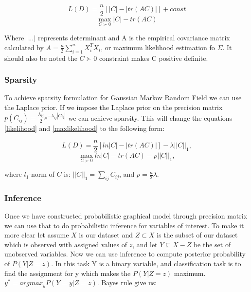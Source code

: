 \documentclass{article} %
\begin{document}
\begin{multicols}{2}
\begin{equation}\label{likelihood}
L(D) = \frac{n}{2} [|C| -  |tr(AC)|] + const
\end{equation}\break
\begin{equation}\label{maxlikelihood}
\max_{C\succ0} |C| - tr(AC)
\end{equation}
\end{multicols}

Where $|...|$ represents determinant and A is the empirical covariance 
matrix calculated by $A = \frac{n}{2} \sum_{i=1}^{n} X_i^T X_i$, or 
maximum likelihood estimation fo $\Sigma$. It should also be noted 
the $C\succ0$ constraint makes C positive definite.\\


\subsubsection{Sparsity}
To achieve sparsity formulation for Gaussian Markov Random Field we can use 
the Laplace prior. If we impose the Laplace prior on the precision matrix 
$p(C_{ij}) = \frac{\lambda_{ij}}{2} e^{-\lambda_{ij}|C_{ij}|} $ we can 
achieve sparsity. This will change the equations \eqref{likelihood} and 
\eqref{maxlikelihood} to the following form:

\begin{multicols}{2}
\begin{equation}\label{loglikelihood}
L(D) = \frac{n}{2} [ln|C| -  |tr(AC)|] - \lambda||C||_{1}, 
\end{equation}\break
\begin{equation}\label{logmaxlikelihood}
\max_{C\succ0} ln|C| - tr(AC) - \rho||C||_{1},
\end{equation}
\end{multicols}

where $l_{1}$-norm of $C$ is: $||C||_{1}= \sum_{ij}C_{ij}$, and $\rho=\frac{n}{2}\lambda $. \\


\subsubsection{Inference}
Once we have constructed probabilistic graphical model through precision 
matrix we can use that to do probabilistic inference for variables of 
interest. To make it more clear let assume $X$ is our dataset and 
$Z \subset X$ is the subset of our dataset which is observed with 
assigned values of $z$, and let $Y \subseteq X - Z$ be the set of unobserved 
variables. Now we can use inference to compute posterior probability of 
$P(Y|Z=z)$. In this task Y is a binary variable, and classification task is 
to find the assignment for y which makes the $P(Y|Z=z)$ maximum. 
$y^* = argmax_{y} P(Y=y|Z=z)$. Bayes rule give us: 
\end{document}
